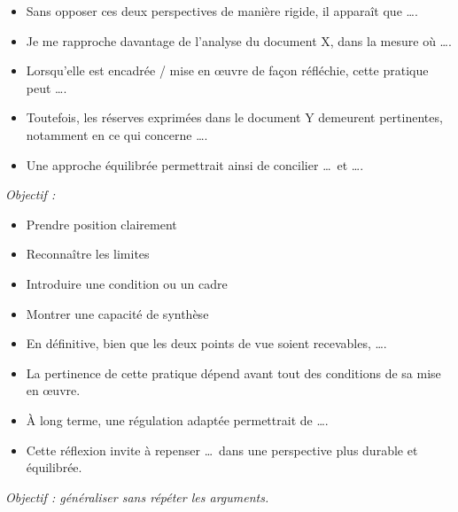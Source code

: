 \documentclass[12pt,a4paper]{article}
\begin{document}

\begin{tcolorbox}[title=\textbf{STEP 2 · Analyse et position argumentée}]

\begin{itemize}
  \item Sans opposer ces deux perspectives de manière rigide, il apparaît que \dots.
  \item Je me rapproche davantage de l'analyse du document X, dans la mesure où \dots.
  \item Lorsqu'elle est encadrée / mise en œuvre de façon réfléchie, cette pratique peut \dots.
  \item Toutefois, les réserves exprimées dans le document Y demeurent pertinentes, notamment en ce qui concerne \dots.
  \item Une approche équilibrée permettrait ainsi de concilier \dots\ et \dots.
\end{itemize}

\emph{Objectif :}
\begin{itemize}
  \item Prendre position clairement
  \item Reconnaître les limites
  \item Introduire une condition ou un cadre
  \item Montrer une capacité de synthèse
\end{itemize}

\end{tcolorbox}



\begin{tcolorbox}[title=\textbf{STEP 3 · Conclusion structurée}]

\begin{itemize}
  \item En définitive, bien que les deux points de vue soient recevables, \dots.
  \item La pertinence de cette pratique dépend avant tout des conditions de sa mise en œuvre.
  \item À long terme, une régulation adaptée permettrait de \dots.
  \item Cette réflexion invite à repenser \dots\ dans une perspective plus durable et équilibrée.
\end{itemize}

\emph{Objectif : généraliser sans répéter les arguments.}

\end{tcolorbox}
\end{document}

